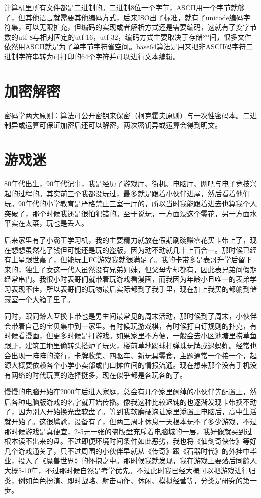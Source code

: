 \documentclass[
  letterpaper,
  DIV=11,
  numbers=noendperiod]{scrreprt}
\begin{document}
计算机里所有文件都是二进制的。二进制8位一个字节，ASCII用一个字节就够了，但其他语言就需要其他编码方式，后来ISO出了标准，就有了unicode编码字符集，可以无限扩充，但编码的实现或者解析方式还是需要编码，这就有了变字节数的utf-8与相对固定的utf-16，utf-32，编码方式主要取决于存储空间，很多文件依然用ASCII就是为了单字节字符省空间。base64算法是用来把非ASCII码字符二进制字符串转为可打印的64个字符并可以进行文本编辑。

\section{加密解密}\label{ux52a0ux5bc6ux89e3ux5bc6}

密码学两大原则：算法可公开密钥来保密（柯克霍夫原则）与一次性密码本。二进制异或运算可保证加密后还可以解密，两次密钥异或运算会得到明文。

\section{游戏迷}\label{ux6e38ux620fux8ff7}

80年代出生，90年代记事，我是经历了游戏厅、街机、电脑厅、网吧与电子竞技兴起的过程的。其实前三个我都没玩过，最多就是跟着小伙伴进屋，然后看着他们玩。90年代的小学教育是严格禁止三室一厅的，所以当时我能跟着进去也算我个人突破了，那个时候我还是很怕犯错的。至于说玩，一方面没这个零花，另一方面水平实在太菜，玩也是丢人。

后来家里有了小霸王学习机，我的主要精力就放在假期刷碗赚零花买卡带上了，现在想想虽然花了钱但可能还是玩的盗版，因为动不动就几十上百合一。那时候已经有土星跟世嘉了，但能玩上FC游戏我就很满足了。我的卡带多是表哥升学后留下来的，独生子女这一代人虽然没有兄弟姐妹，但父母辈却都有，因此表兄弟间假期经常串门。我很小时表哥们就带着玩游戏看漫画，而我因为年龄小且唯一的表弟学习表现不佳，所以表哥们的玩物最后实际都到了我手里，现在加上我买的都躺到储藏室一个大箱子里了。

同时，跟同龄人互换卡带也是男生间最常见的周末活动，那时候到了周末，小伙伴会带着自己的宝贝集中到一家里。有时候玩游戏棋，有时候打自订规则的扑克，有时候看漫画，但更多时候是打游戏。如果家里不方便，一般会去小区池塘里捞草鱼跟虾，建筑工地里偷转头搭炉子玩火，楼前草地踢球打弹珠玩牌或逮蚂蚱。经常也会出现一阵阵的流行，卡牌收集、四驱车、新玩具零食，主题通常一个接一个，起源大概要依赖各个小学小卖部或门口摊位间的情报流通。现在想来那个没有手机没有网络的时代玩真的选择挺多，现在似乎都是各玩各的了。

慢慢的电脑开始在2000年后进入家庭，总会有几个家里阔绰的小伙伴先配置上，然后各种电脑版游戏的名字就开始传播。像我这种比较迟钝的也逐渐发现卡带换不动了，因为别人开始换光盘软盘了。等到我软磨硬泡让家里添置上电脑后，高中生活就开始了。这很尴尬，设备有了，但两三周才休息一天根本玩不了多少游戏，不过那时候游戏是真便宜，2-5元一张的盗版盘充斥着电脑城的一层，我好像就买到过根本读不出来的盘。不过即便环境时间条件如此恶劣，我也将《仙剑奇侠传》等好几个游戏通关了，只不过周围的小伙伴早就从《传奇》跟《石器时代》的外挂中毕业，投入了《魔兽世界》的怀抱之中。那时候我就发现，我在游戏上要落后同龄人大概5-10年，不过那时候自然是考学优先。不过此时我已经大概可以把游戏进行归类，例如角色扮演、即时战略、射击动作、休闲、模拟经营等，分类是研究的第一步。
\end{document}
